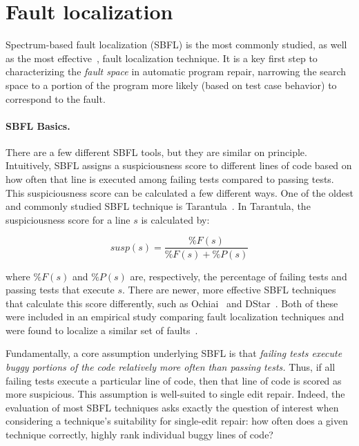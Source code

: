 \section{Fault localization} \label{secFL}



Spectrum-based fault localization (SBFL) is the most commonly studied, as well as the most 
effective~\cite{zou2019empirical}, fault localization technique. It is a key
first step to characterizing the \emph{fault space} in automatic program repair,
narrowing the search space to a portion of the program more likely (based on
test case behavior) to correspond to the fault.  

\paragraph{SBFL Basics.} 
There are a few different SBFL tools, but they are 
similar on principle. Intuitively, SBFL assigns a suspiciousness score to different lines of 
code based on how often that line is executed among failing tests compared to passing 
tests. This suspiciousness score can be calculated a few different ways. One of the oldest 
and commonly studied SBFL technique is Tarantula~\cite{tarantula}. In Tarantula, the 
suspiciousness score for a line $s$ is calculated by:

$$\mathit{susp(s)} 
=\frac{\mathit{\%F(s)}}{\mathit{\%F(s)} + \mathit{\%P(s)}}$$

where  $\mathit{\%F(s)}$ and $\mathit{\%P(s)}$ are, respectively, the percentage of failing 
tests and passing tests that execute $s$. There are newer, more effective 
SBFL techniques that calculate this score differently, such as Ochiai~\cite{ochiai} and 
DStar~\cite{wong2013dstar}. Both of these were included in an empirical study 
comparing fault localization techniques and were found to localize a similar set of 
faults~\cite{zou2019empirical}.
  

Fundamentally, a core assumption underlying SBFL is that \emph{failing tests execute 
buggy portions of the code relatively more often than passing tests.} 
Thus, if all failing tests execute a 
particular line of code, then that line of code is scored as more suspicious.
This assumption is well-suited to single edit repair. Indeed, the evaluation
of most SBFL techniques asks exactly the question of interest when considering a
technique's suitability for single-edit repair: how often does a given technique
correctly, highly rank individual buggy lines of code? 

